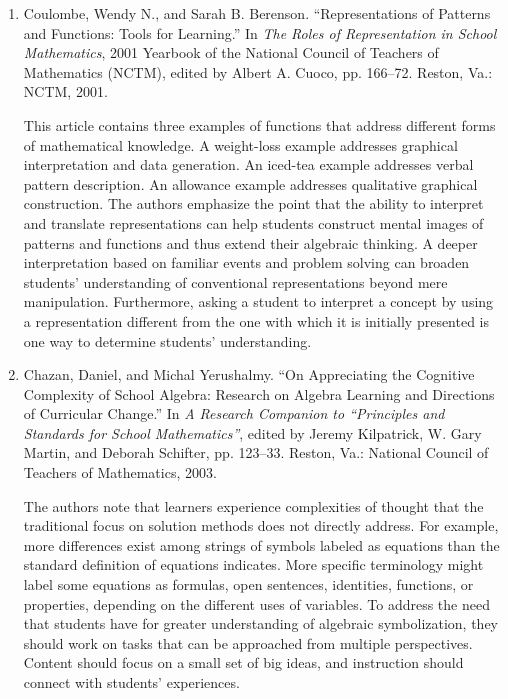 {{\begin{enumerate}
        \item Coulombe, Wendy N., and Sarah B. Berenson. ``Representations of Patterns and Functions: Tools for Learning.'' In \emph{The Roles of Representation in School Mathematics}, 2001 Yearbook of the National Council of Teachers of Mathematics (NCTM), edited by Albert A. Cuoco, pp. 166--72. Reston, Va.: NCTM, 2001.\vspace{.25\baselineskip}

          \par\noindent\hspace*{1em} This article contains three examples of functions that address different forms of mathematical knowledge. A weight-loss example addresses graphical interpretation and data generation. An iced-tea example addresses verbal pattern description. An allowance example addresses qualitative graphical construction. The authors emphasize the point that the ability to interpret and translate representations can help students construct mental images of patterns and functions and thus extend their algebraic thinking. A deeper interpretation based on familiar events and problem solving can broaden students' understanding of conventional representations beyond mere manipulation. Furthermore, asking a student to interpret a concept by using a representation different from the one with which it is initially presented is one way to determine students' understanding.\vspace{.35\baselineskip}

        \item Chazan, Daniel, and Michal Yerushalmy. “On Appreciating the Cognitive Complexity of School Algebra: Research on Algebra Learning and Directions of Curricular Change.” In \emph{A Research Companion to ``Principles and Standards for School Mathematics''}, edited by Jeremy Kilpatrick, W. Gary Martin, and Deborah Schifter, pp. 123--33. Reston, Va.: National Council of Teachers of Mathematics, 2003.\vspace{.25\baselineskip}

          \par\noindent\hspace*{1em} The authors note that learners experience complexities of thought that the traditional focus on solution methods does not directly address. For example, more differences exist among strings of symbols labeled as equations than the standard definition of equations indicates. More specific terminology might label some equations as formulas, open sentences, identities, functions, or properties, depending on the different uses of variables. To address the need that students have for greater understanding of algebraic symbolization, they should work on tasks that can be approached from multiple perspectives. Content should focus on a small set of big ideas, and instruction should connect with students' experiences.
      \end{enumerate}
    }
  }
